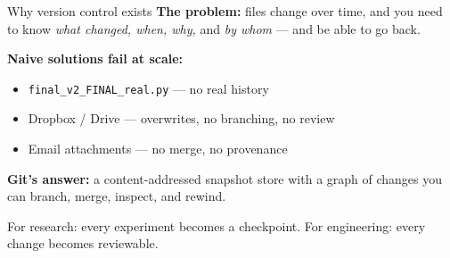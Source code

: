 \documentclass[10pt,aspectratio=169]{beamer}
\begin{document}

\begin{frame}{Why version control exists}
  \textbf{The problem:} files change over time, and you need to know
  \emph{what changed, when, why,} and \emph{by whom} --- and be able to
  go back.

  \vspace{0.6em}
  \textbf{Naive solutions fail at scale:}
  \begin{itemize}
    \item \texttt{final\_v2\_FINAL\_real.py} --- no real history
    \item Dropbox / Drive --- overwrites, no branching, no review
    \item Email attachments --- no merge, no provenance
  \end{itemize}

  \vspace{0.6em}
  \textbf{Git's answer:} a \alert{content-addressed snapshot store}
  with a graph of changes you can branch, merge, inspect, and rewind.

  \vspace{0.8em}
  \begin{center}
    \footnotesize\color{ghMuted}
    For research: every experiment becomes a checkpoint.
    For engineering: every change becomes reviewable.
  \end{center}
\end{frame}
\end{document}

